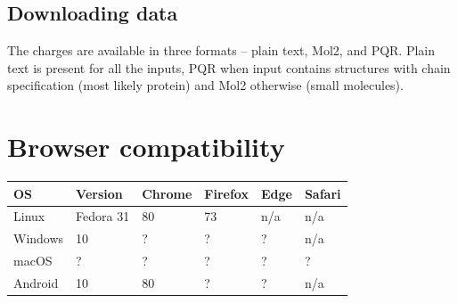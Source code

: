 \documentclass[oneside]{memoir}
\begin{document}
\subsection*{Downloading data}
The charges are available in three formats – plain text, Mol2, and PQR. Plain text is present for all the inputs, PQR when input contains structures with chain specification (most likely protein) and Mol2 otherwise (small molecules).

\section*{Browser compatibility}

\begin{tabular}{llllll}
\toprule
OS & Version & Chrome & Firefox & Edge & Safari\\
\midrule
Linux & Fedora 31 & 80 & 73 & n/a & n/a\\
Windows & 10 & ? & ? & ? & n/a\\
macOS & ? & ? & ? & ? & ?\\
Android & 10 & 80 & ? & ? & n/a \\
\bottomrule

\end{tabular}
\end{document}
